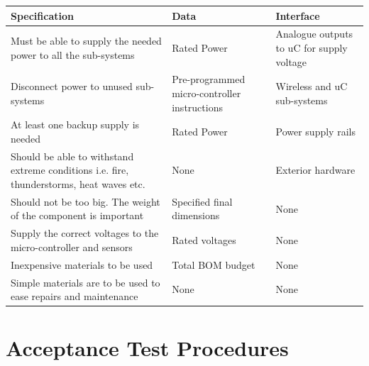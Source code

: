 \documentclass[12pt]{article}
\begin{document}
\begin{center}
  \begin{table}[!htb]
    
    \hskip-2.2cm\begin{tabular}{|p{10cm}|p{4cm}|p{4cm}|}
        \hline
        \textbf{Specification} & \textbf{Data} & \textbf{Interface} \\
        \hline
        Must be able to supply the needed power to all the sub-systems & Rated Power & Analogue outputs to uC for supply voltage \\[0.3cm]
        Disconnect power to unused sub-systems & Pre-programmed micro-controller instructions & Wireless and uC sub-systems\\[0.3cm]
        At least one backup supply is needed & Rated Power & Power supply rails\\[0.3cm]
        Should be able to withstand extreme conditions i.e. fire, thunderstorms, heat waves etc. & None & Exterior hardware\\[0.3cm]
        Should not be too big. The weight of the component is important & Specified final dimensions & None\\[0.3cm]
        Supply the correct voltages to the micro-controller and sensors & Rated voltages & None\\[0.3cm]
        Inexpensive materials to be used & Total BOM budget & None\\[0.3cm]
        Simple materials are to be used to ease repairs and maintenance & None & None \\[0.3cm]

        \hline

    \end{tabular}    
    
    \label{tab:summary_measurments}
   \end{table}
\end{center}

\newpage
\section{Acceptance Test Procedures}
\end{document}
